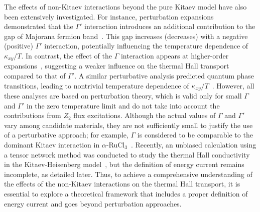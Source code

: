 \documentclass[twocolumn,superscriptaddress,showpacs, longbibliography, aps, prx]{revtex4-2}
\begin{document}
The effects of non-Kitaev interactions beyond the pure Kitaev model have also been extensively investigated. 
For instance, perturbation expansions demonstrated that the $\Gamma'$ 
interaction introduces an additional contribution to the gap of Majorana fermion band~\cite{TakikawaF2020}. 
This gap increases (decreases) with a negative (positive) $\Gamma'$ interaction, potentially influencing the temperature dependence of $\kappa_{xy}/T$. 
In contrast, the effect of the $\Gamma$ interaction appears at higher-order expansions~\cite{YamadaF2021}, suggesting a weaker influence on the thermal Hall transport compared to that of $\Gamma'$. 
A similar perturbative analysis predicted quantum phase transitions, leading to nontrivial temperature dependence of $\kappa_{xy}/T$~\cite{GoJM2019}. 
However, all these analyses are based on perturbation theory, which is valid only for small $\Gamma$ and $\Gamma'$ in the zero temperature limit and do not take into account the contributions from $Z_2$ flux excitations. 
Although the actual values of $\Gamma$ and $\Gamma'$ vary among candidate materials, they are not sufficiently small to justify the use of a perturbative approach; for example, $\Gamma$ is considered to be comparable to the dominant Kitaev interaction in $\alpha$-RuCl$_3$~\cite{Suzuki2018,laurell2020dynamical,Maksimov2020}. 
Recently, an unbiased calculation using a tensor network method was conducted to study the thermal Hall conductivity in the Kitaev-Heisenberg model~\cite{KumarT2023}, but the definition of energy current remains incomplete, as detailed later. 
Thus, to achieve a comprehensive understanding of the effects of the non-Kitaev interactions on the thermal Hall transport, it is essential to explore a theoretical framework that includes a proper definition of energy current and goes beyond perturbation approaches.
\end{document}

